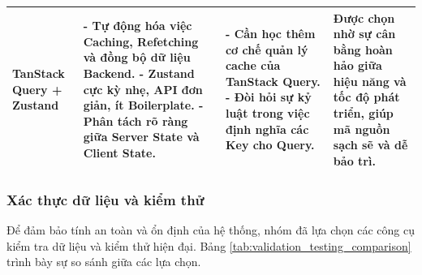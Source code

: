 \begin{center}
\begin{longtable}{|p{2.5cm}|p{4cm}|p{4cm}|p{3.5cm}|}
        TanStack Query + Zustand                                                  &
        - Tự động hóa việc Caching, Refetching và đồng bộ dữ liệu Backend. \newline
        - Zustand cực kỳ nhẹ, API đơn giản, ít Boilerplate. \newline
        - Phân tách rõ ràng giữa Server State và Client State.                    &
        - Cần học thêm cơ chế quản lý cache của TanStack Query. \newline
        - Đòi hỏi sự kỷ luật trong việc định nghĩa các Key cho Query.             &
        Được chọn nhờ sự cân bằng hoàn hảo giữa hiệu năng và tốc độ phát triển, giúp mã nguồn sạch sẽ và dễ bảo trì.                                                                              \\ \hline
    \end{longtable}
\end{center}

\subsubsection{Xác thực dữ liệu và kiểm thử}

Để đảm bảo tính an toàn và ổn định của hệ thống, nhóm đã lựa chọn các công cụ kiểm tra dữ liệu và kiểm thử hiện đại. Bảng \ref{tab:validation_testing_comparison} trình bày sự so sánh giữa các lựa chọn.


